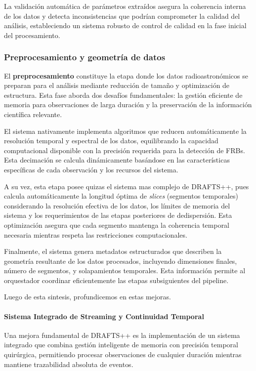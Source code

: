 La validación automática de parámetros extraídos asegura la coherencia interna de los datos y detecta inconsistencias que podrían comprometer la calidad del análisis, estableciendo un sistema robusto de control de calidad en la fase inicial del procesamiento.

\subsubsection{Preprocesamiento y geometría de datos}

El \textbf{preprocesamiento} constituye la etapa donde los datos radioastronómicos se preparan para el análisis mediante reducción de tamaño y optimización de estructura. Esta fase aborda dos desafíos fundamentales: la gestión eficiente de memoria para observaciones de larga duración y la preservación de la información científica relevante.

El sistema nativamente implementa algoritmos que reducen automáticamente la resolución temporal y espectral de los datos, equilibrando la capacidad computacional disponible con la precisión requerida para la detección de FRBs. Esta decimación se calcula dinámicamente basándose en las características específicas de cada observación y los recursos del sistema.

A su vez, esta etapa posee quizas el sistema mas complejo de DRAFTS++, pues calcula automáticamente la longitud óptima de \emph{slices} (segmentos temporales) considerando la resolución efectiva de los datos, los límites de memoria del sistema y los requerimientos de las etapas posteriores de dedispersión. Esta optimización asegura que cada segmento mantenga la coherencia temporal necesaria mientras respeta las restricciones computacionales.

Finalmente, el sistema genera metadatos estructurados que describen la geometría resultante de los datos procesados, incluyendo dimensiones finales, número de segmentos, y solapamientos temporales. Esta información permite al orquestador coordinar eficientemente las etapas subsiguientes del pipeline.

Luego de esta sintesis, profundicemos en estas mejoras.

\paragraph{Sistema Integrado de Streaming y Continuidad Temporal}

Una mejora fundamental de DRAFTS++ es la implementación de un sistema integrado que combina gestión inteligente de memoria con precisión temporal quirúrgica, permitiendo procesar observaciones de cualquier duración mientras mantiene trazabilidad absoluta de eventos.

